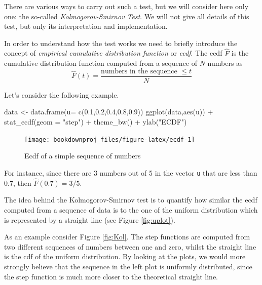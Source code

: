 \documentclass[
]{book}
\newenvironment{Shaded}{\begin{snugshade}}{\end{snugshade}}
\newcommand{\AttributeTok}[1]{\textcolor[rgb]{0.77,0.63,0.00}{#1}}
\newcommand{\FloatTok}[1]{\textcolor[rgb]{0.00,0.00,0.81}{#1}}
\newcommand{\FunctionTok}[1]{\textcolor[rgb]{0.00,0.00,0.00}{#1}}
\newcommand{\NormalTok}[1]{#1}
\newcommand{\OtherTok}[1]{\textcolor[rgb]{0.56,0.35,0.01}{#1}}
\newcommand{\SpecialCharTok}[1]{\textcolor[rgb]{0.00,0.00,0.00}{#1}}
\newcommand{\StringTok}[1]{\textcolor[rgb]{0.31,0.60,0.02}{#1}}
\theoremstyle{definition}
\theoremstyle{definition}
\theoremstyle{definition}
\theoremstyle{definition}
\theoremstyle{remark}
\begin{document}
There are various ways to carry out such a test, but we will consider here only one: the so-called \emph{Kolmogorov-Smirnov Test}. We will not give all details of this test, but only its interpretation and implementation.

In order to understand how the test works we need to briefly introduce the concept of \emph{empirical cumulative distribution function} or \emph{ecdf}. The ecdf \(\hat{F}\) is the cumulative distribution function computed from a sequence of \(N\) numbers as
\[
\hat{F}(t)= \frac{\mbox{numbers in the sequence }\leq t}{N}
\]

Let's consider the following example.

\begin{Shaded}
\begin{Highlighting}[]
\NormalTok{data }\OtherTok{\textless{}{-}} \FunctionTok{data.frame}\NormalTok{(}\AttributeTok{u=} \FunctionTok{c}\NormalTok{(}\FloatTok{0.1}\NormalTok{,}\FloatTok{0.2}\NormalTok{,}\FloatTok{0.4}\NormalTok{,}\FloatTok{0.8}\NormalTok{,}\FloatTok{0.9}\NormalTok{))}
\FunctionTok{ggplot}\NormalTok{(data,}\FunctionTok{aes}\NormalTok{(u)) }\SpecialCharTok{+} \FunctionTok{stat\_ecdf}\NormalTok{(}\AttributeTok{geom =} \StringTok{"step"}\NormalTok{) }\SpecialCharTok{+} \FunctionTok{theme\_bw}\NormalTok{() }\SpecialCharTok{+} \FunctionTok{ylab}\NormalTok{(}\StringTok{"ECDF"}\NormalTok{)}
\end{Highlighting}
\end{Shaded}

\begin{figure}

{\centering \texttt{[image: bookdownproj\_files/figure-latex/ecdf-1]} 

}

\caption{Ecdf of a simple sequence of numbers}\label{fig:ecdf}
\end{figure}

For instance, since there are 3 numbers out of 5 in the vector \texttt{u} that are less than 0.7, then \(\hat{F}(0.7)=3/5\).

The idea behind the Kolmogorov-Smirnov test is to quantify how similar the ecdf computed from a sequence of data is to the one of the uniform distribution which is represented by a straight line (see Figure \ref{fig:uplot}).

As an example consider Figure \ref{fig:Kol}. The step functions are computed from two different sequences of numbers between one and zero, whilst the straight line is the cdf of the uniform distribution. By looking at the plots, we would more strongly believe that the sequence in the left plot is uniformly distributed, since the step function is much more closer to the theoretical straight line.
\end{document}
